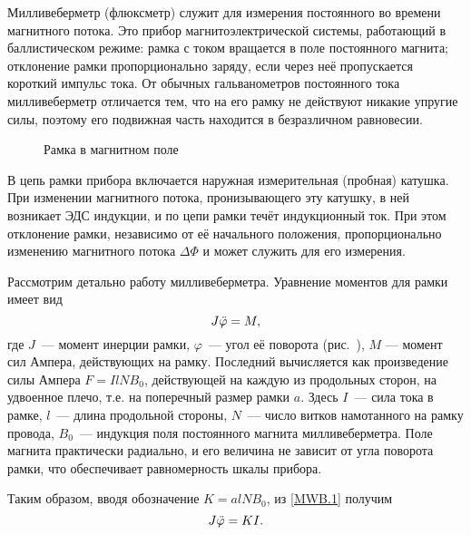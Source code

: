 
\begin{labsupplement}
\label{MWB}

Милливеберметр (флюксметр) служит для измерения постоянного во времени
магнитного потока. Это прибор магнитоэлектрической системы, 
работающий в баллистическом режиме: рамка с током вращается в поле 
постоянного магнита; отклонение рамки пропорционально заряду,
если через неё пропускается короткий импульс тока. 
От обычных гальванометров постоянного тока милливеберметр 
отличается тем, что на его рамку не действуют никакие упругие силы, 
поэтому его подвижная часть находится в безразличном равновесии.

\begin{figure}[h!]
    \caption{Рамка в магнитном поле}
\end{figure}

В цепь рамки прибора включается наружная измерительная (пробная) катушка. 
При изменении магнитного потока, пронизывающего эту катушку, 
в ней возникает ЭДС индукции, и по цепи рамки течёт индукционный ток. 
При этом отклонение рамки, независимо от её начального
положения, пропорционально изменению магнитного потока $\Delta\Phi$ 
и может служить для его измерения.

Рассмотрим детально работу милливеберметра. 
Уравнение моментов для рамки имеет вид
\begin{equation}
    J\ddot{\varphi}=M,
    \eqmark{MWB.1}
\end{equation}
где $J$~--- момент инерции рамки, 
$\varphi$~--- угол её поворота (рис.~),
$M$ --- момент сил Ампера, действующих на рамку.
Последний вычисляется как произведение силы Ампера $F=IlNB_0$, 
действующей на каждую из продольных сторон,
на удвоенное плечо, т.е. на поперечный размер
рамки $a$. Здесь $I$~--- сила тока в рамке, $l$~--- длина продольной
стороны, $N$~--- число витков намотанного на рамку провода, 
$B_0$~--- индукция поля постоянного магнита милливеберметра. 
Поле магнита практически радиально, и его величина не зависит от угла поворота
рамки, что обеспечивает равномерность шкалы прибора. 

Таким образом, вводя обозначение $K=alNB_0$, из \eqref{MWB.1} 
получим
\begin{equation}
    J\ddot{\varphi}=KI.
    \eqmark{MWB.2}
\end{equation}


\end{labsupplement}
